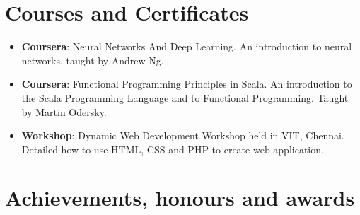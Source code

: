 \documentclass[%
    doublesided,
    paper=a4,
    fontsize=10pt
    ]{my-resume}
\begin{document}
{{        \section{Courses and Certificates}
        \begin{itemize}
            \item \textbf{Coursera}: Neural Networks And Deep Learning. An introduction to neural networks, taught by Andrew Ng.
                  \vspace{1em}
            \item \textbf{Coursera}: Functional Programming Principles in Scala. An introduction to the Scala Programming Language and to Functional Programming. Taught by Martin Odersky.
                  \vspace{1em}
            \item \textbf{Workshop}: Dynamic Web Development Workshop held in VIT, Chennai. Detailed how to use HTML, CSS and PHP to create web application.
        \end{itemize}
        
        \section{Achievements, honours and awards}
    }
}
\makebody
\clearpage
\end{document}
